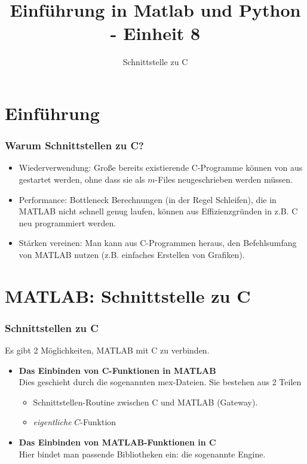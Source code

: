 \documentclass[hyperref={xetex}]{beamer}
\title{Einführung in Matlab und Python - Einheit 8}
\subtitle{Schnittstelle zu C}
\begin{document}
\titlepage
\section{Einführung}
%
%
%
%
\begin{frame}[fragile]\frametitle{Warum Schnittstellen zu C?}
\begin{itemize}
\item \alert{Wiederverwendung}: Gro{\ss}e bereits existierende C-Programme k\"onnen von  aus
  gestartet werden, ohne dass sie als $m$-Files neugeschrieben werden
  m\"ussen. 
\item \alert{Performance}: Bottleneck Berechnungen (in der Regel Schleifen), die in MATLAB nicht
  schnell genug laufen, k\"onnen aus Effizienzgr\"unden in z.B. C neu programmiert
  werden. 
\item \alert{Stärken vereinen}: Man kann aus C-Programmen heraus, den Befehlsumfang von MATLAB nutzen (z.B. einfaches Erstellen von Grafiken).
\end{itemize}
\end{frame}


\section{MATLAB: Schnittstelle zu C}
%
%
\begin{frame}[fragile]\frametitle{Schnittstellen zu C}
Es gibt 2 M\"oglichkeiten, MATLAB mit C zu verbinden. 
\begin{itemize}
\item \textbf{Das Einbinden von C-Funktionen in MATLAB}\\ Dies geschieht durch die sogenannten
      \alert{mex-Dateien}. Sie bestehen aus 2 Teilen 
\begin{itemize}
\item  Schnittstellen-Routine zwischen C und MATLAB (Gateway).
\item \textit{eigentliche} $C$-Funktion
\end{itemize}

\item \textbf{Das Einbinden von MATLAB-Funktionen in C}\\ Hier bindet
      man passende Bibliotheken ein: die sogenannte \alert{Engine}.
\end{itemize}
\end{frame}
%
%
\end{document}
